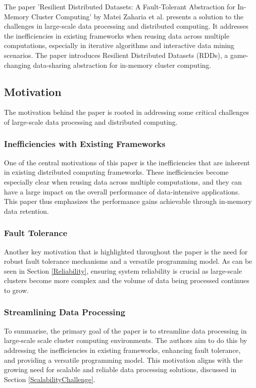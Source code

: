 \documentclass[10pt]{proc}
\begin{document}
The paper 'Resilient Distributed Datasets: A Fault-Tolerant Abstraction for In-Memory Cluster Computing' by Matei Zaharia et al. \cite{RDDs} presents a solution to the challenges in large-scale data processing and distributed computing. It addresses the inefficiencies in existing frameworks when reusing data across multiple computations, especially in iterative algorithms and interactive data mining scenarios. The paper introduces Resilient Distributed Datasets (RDDs), a game-changing data-sharing abstraction for in-memory cluster computing.

\subsection{Motivation}

The motivation behind the paper  is rooted in addressing some critical challenges of large-scale data processing and distributed computing. 

\subsubsection{Inefficiencies with Existing Frameworks}
One of the central motivations of this paper is the inefficiencies that are inherent in existing distributed computing frameworks. These inefficiencies become especially clear when reusing data across multiple computations, and they can have a large impact on the overall performance of data-intensive applications. This paper thus emphasizes the performance gains achievable through in-memory data retention.

\subsubsection{Fault Tolerance}
Another key motivation that is highlighted throughout the paper is the need for robust fault tolerance mechanisms and a versatile programming model. As can be seen in Section \ref{Reliability}, ensuring system reliability is crucial as large-scale clusters become more complex and the volume of data being processed continues to grow.

\subsubsection{Streamlining Data Processing}
To summarise, the primary goal of the paper is to streamline data processing in large-scale scale cluster computing environments. The authors aim to do this by addressing the inefficiencies in existing frameworks, enhancing fault tolerance, and providing a versatile programming model. This motivation aligns with the growing need for scalable and reliable data processing solutions, discussed in Section \ref{ScalabilityChallenge}.
\end{document}
